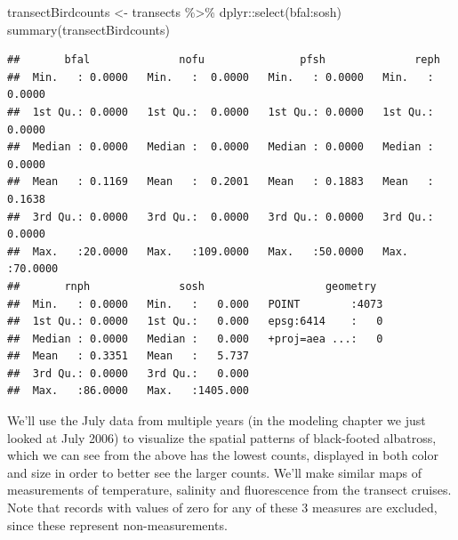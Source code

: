 \documentclass[
]{book}
\newenvironment{Shaded}{\begin{snugshade}}{\end{snugshade}}
\newcommand{\FunctionTok}[1]{\textcolor[rgb]{0,0,0}{#1}}
\newcommand{\NormalTok}[1]{#1}
\newcommand{\OtherTok}[1]{\textcolor[rgb]{0.37,0.37,0.37}{#1}}
\newcommand{\SpecialCharTok}[1]{\textcolor[rgb]{0,0,0}{#1}}
\begin{document}
\begin{Shaded}
\begin{Highlighting}[]
\NormalTok{transectBirdcounts }\OtherTok{\textless{}{-}}\NormalTok{ transects }\SpecialCharTok{\%\textgreater{}\%}
\NormalTok{  dplyr}\SpecialCharTok{::}\FunctionTok{select}\NormalTok{(bfal}\SpecialCharTok{:}\NormalTok{sosh)}
\FunctionTok{summary}\NormalTok{(transectBirdcounts)}
\end{Highlighting}
\end{Shaded}

\begin{verbatim}
##       bfal              nofu               pfsh              reph        
##  Min.   : 0.0000   Min.   :  0.0000   Min.   : 0.0000   Min.   : 0.0000  
##  1st Qu.: 0.0000   1st Qu.:  0.0000   1st Qu.: 0.0000   1st Qu.: 0.0000  
##  Median : 0.0000   Median :  0.0000   Median : 0.0000   Median : 0.0000  
##  Mean   : 0.1169   Mean   :  0.2001   Mean   : 0.1883   Mean   : 0.1638  
##  3rd Qu.: 0.0000   3rd Qu.:  0.0000   3rd Qu.: 0.0000   3rd Qu.: 0.0000  
##  Max.   :20.0000   Max.   :109.0000   Max.   :50.0000   Max.   :70.0000  
##       rnph              sosh                   geometry   
##  Min.   : 0.0000   Min.   :   0.000   POINT        :4073  
##  1st Qu.: 0.0000   1st Qu.:   0.000   epsg:6414    :   0  
##  Median : 0.0000   Median :   0.000   +proj=aea ...:   0  
##  Mean   : 0.3351   Mean   :   5.737                       
##  3rd Qu.: 0.0000   3rd Qu.:   0.000                       
##  Max.   :86.0000   Max.   :1405.000
\end{verbatim}

We'll use the July data from multiple years (in the modeling chapter we just looked at July 2006) to visualize the spatial patterns of black-footed albatross, which we can see from the above has the lowest counts, displayed in both color and size in order to better see the larger counts. We'll make similar maps of measurements of temperature, salinity and fluorescence from the transect cruises. Note that records with values of zero for any of these 3 measures are excluded, since these represent non-measurements.
\end{document}
